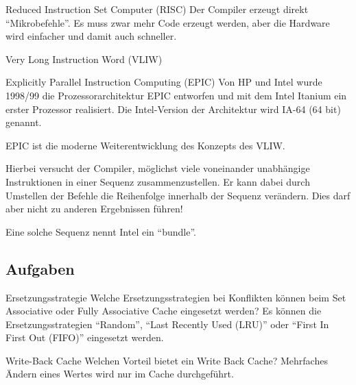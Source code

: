 \begin{defi}{Reduced Instruction Set Computer (RISC)}
  Der Compiler erzeugt direkt \enquote{Mikrobefehle}.
  Es muss zwar mehr Code erzeugt werden,
  aber die Hardware wird einfacher und damit auch schneller.
\end{defi}

\begin{defi}{Very Long Instruction Word (VLIW)}
\end{defi}

\begin{defi}{Explicitly Parallel Instruction Computing (EPIC)}
  Von HP und Intel wurde 1998/99 die Prozessorarchitektur EPIC entworfen
  und mit dem Intel Itanium ein erster Prozessor realisiert.
  Die Intel-Version der Architektur wird IA-64 (64 bit) genannt.

  EPIC ist die moderne Weiterentwicklung des Konzepts des VLIW.

  Hierbei versucht der Compiler,
  möglichst viele voneinander unabhängige Instruktionen in einer Sequenz zusammenzustellen.
  Er kann dabei durch Umstellen der Befehle die Reihenfolge innerhalb der Sequenz verändern.
  Dies darf aber nicht zu anderen Ergebnissen führen!

  Eine solche Sequenz nennt Intel ein \enquote{bundle}.
\end{defi}

\subsection{Aufgaben}

\begin{aufgabe}[Caches]{Ersetzungsstrategie}
  Welche Ersetzungsstrategien bei Konflikten können beim Set Associative oder Fully Associative Cache eingesetzt werden?
  \tcblower
  Es können die Ersetzungsstrategien \enquote{Random},
  \enquote{Last Recently Used (LRU)} oder \enquote{First In First Out (FIFO)} eingesetzt werden.
\end{aufgabe}

\begin{aufgabe}[Caches]{Write-Back Cache}
  Welchen Vorteil bietet ein Write Back Cache?
  \tcblower
  Mehrfaches Ändern eines Wertes wird nur im Cache durchgeführt.
\end{aufgabe}

